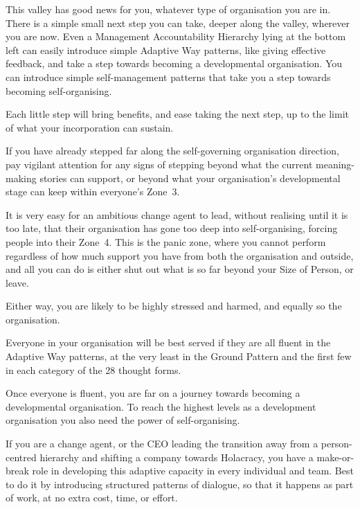 This valley has good news for you, whatever type of organisation you are in. There is a simple small next step you can take, deeper along the valley, wherever you are now. Even a Management Accountability Hierarchy lying at the bottom left can easily introduce simple Adaptive Way  patterns, like giving effective feedback, and take a step towards becoming a developmental organisation. You can introduce simple self-management patterns that take you a step towards becoming self-organising. 


Each little step will bring benefits, and ease taking the next step, up to the limit of what your incorporation can sustain.


If you have already stepped far along the self-governing organisation direction, pay vigilant attention for any signs of stepping beyond what the current meaning\hyp{}making stories can support, or beyond what your organisation's developmental stage can keep within everyone's Zone~3. 


It is very easy for an ambitious change agent to lead, without realising until it is too late, that their organisation has gone too deep into self-organising, forcing people into their Zone~4. This is the panic zone, where you cannot perform regardless of how much support you have from both the organisation and outside, and all you can do is either shut out what is so far beyond your Size of Person,  or leave. 


Either way, you are likely to be highly stressed and harmed, and equally so the organisation. 


Everyone in your organisation will be best served if they are all fluent in the Adaptive Way patterns, at the very least in the Ground Pattern and the first few in each category of the 28 thought forms.  


Once everyone is fluent, you are far on a journey towards becoming a developmental organisation. To reach the highest levels as a development organisation you also need the power of self-organising.  


If you are a change agent, or the CEO leading the transition away from a person-centred hierarchy and shifting a company towards Holacracy, you have a make-or-break role in developing this adaptive capacity in every individual and team. Best to do it by introducing structured patterns of dialogue, so that it happens as part of work, at no extra cost, time, or effort.


